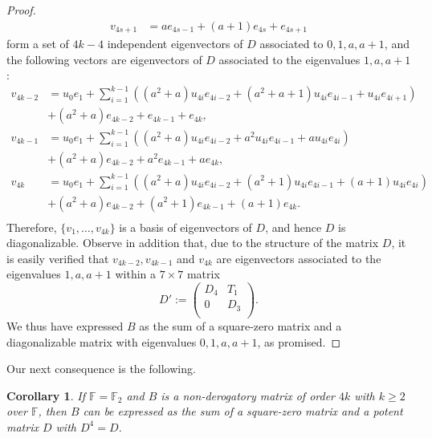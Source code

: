 \documentclass{amsart}
\def\FF{\mathbb{F}}
\newtheorem{corollary}[theorem]{Corollary}
\theoremstyle{definition}
\theoremstyle{remark}
\numberwithin{equation}{section}
\begin{document}
\begin{proof}
\begin{align*}
 v_{4s+1}&=a e_{4s-1}+(a+1) e_{4s}+e_{4s+1}
\end{align*}
form a set of $4k-4$ independent eigenvectors of $D$ associated to $0,1,a,a+1$, and  the following vectors are eigenvectors of $D$ associated to the eigenvalues $1,a,a+1$:
\begin{align*}
  v_{4k-2}&=u_0 e_1+\sum_{i=1}^{k-1}  ( (a^2+a) u_{4i} e_{4i-2}+ (a^2+a+1) u_{4i} e_{4i-1}+ u_{4i} e_{4i+1})\\&+ (a^2+a) e_{4k-2}+  e_{4k-1}+ e_{4k},\\
  v_{4k-1}&=u_0 e_1+\sum_{i=1}^{k-1}  ( (a^2+a) u_{4i} e_{4i-2}+ a^2 u_{4i} e_{4i-1}+a u_{4i} e_{4i})\\&+ (a^2+a) e_{4k-2}+a^2  e_{4k-1}+ a e_{4k},\\
  v_{4k}&=u_0 e_1+\sum_{i=1}^{k-1}  ( (a^2+a) u_{4i} e_{4i-2}+ (a^2+1) u_{4i} e_{4i-1}+(a+1) u_{4i} e_{4i})\\&+ (a^2+a) e_{4k-2}+(a^2+1)  e_{4k-1}+ (a+1) e_{4k}.\\
\end{align*}
Therefore, $\{v_1,\dots, v_{4k}\}$ is a basis of eigenvectors of $D$, and hence $D$ is diagonalizable. Observe in addition that, due to the structure of the matrix
$D$, it is easily verified that $v_{4k-2}, v_{4k-1}$ and $v_{4k}$ are eigenvectors associated to the eigenvalues $1,a,a+1$ within a $7\times 7$ matrix
$$D':=\left(
  \begin{array}{cc}
    D_4 & T_1 \\
    0 & D_3\\
  \end{array}
\right).
$$
We thus have expressed $B$ as the sum of a square-zero matrix and a diagonalizable matrix with eigenvalues $0,1,a,a+1$, as promised.
\end{proof}

Our next consequence is the following.

\begin{corollary}\label{4k-corollary}
If $\FF=\FF_2$ and $B$ is a non-derogatory matrix of order $4k$ with $k\ge 2$ over $\FF$, then $B$ can be expressed as the sum of a square-zero matrix and a potent matrix $D$ with $D^4=D$.
\end{corollary}
\end{document}

